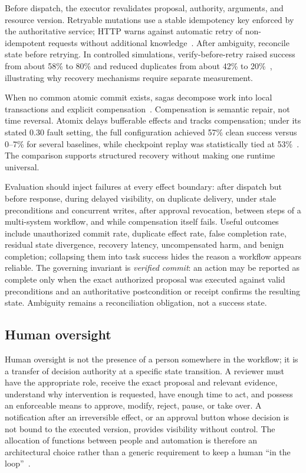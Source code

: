 Before dispatch, the executor revalidates proposal, authority, arguments, and resource version. Retryable mutations use a stable idempotency key enforced by the authoritative service; HTTP warns against automatic retry of non-idempotent requests without additional knowledge~\cite{fielding2022httpsemantics}. After ambiguity, reconcile state before retrying. In controlled simulations, verify-before-retry raised success from about 58\% to 80\% and reduced duplicates from about 42\% to 20\%~\cite{mansoor2026verifiedtoolcalls}, illustrating why recovery mechanisms require separate measurement.

When no common atomic commit exists, sagas decompose work into local transactions and explicit compensation~\cite{garciamolina1987sagas}. Compensation is semantic repair, not time reversal. Atomix delays bufferable effects and tracks compensation; under its stated 0.30 fault setting, the full configuration achieved 57\% clean success versus 0--7\% for several baselines, while checkpoint replay was statistically tied at 53\%~\cite{mohammadi2026atomix}. The comparison supports structured recovery without making one runtime universal.

Evaluation should inject failures at every effect boundary: after dispatch but before response, during delayed visibility, on duplicate delivery, under stale preconditions and concurrent writes, after approval revocation, between steps of a multi-system workflow, and while compensation itself fails. Useful outcomes include unauthorized commit rate, duplicate effect rate, false completion rate, residual state divergence, recovery latency, uncompensated harm, and benign completion; collapsing them into task success hides the reason a workflow appears reliable. The governing invariant is \emph{verified commit}: an action may be reported as complete only when the exact authorized proposal was executed against valid preconditions and an authoritative postcondition or receipt confirms the resulting state. Ambiguity remains a reconciliation obligation, not a success state.

\subsection{Human oversight}

Human oversight is not the presence of a person somewhere in the workflow; it is a transfer of decision authority at a specific state transition. A reviewer must have the appropriate role, receive the exact proposal and relevant evidence, understand why intervention is requested, have enough time to act, and possess an enforceable means to approve, modify, reject, pause, or take over. A notification after an irreversible effect, or an approval button whose decision is not bound to the executed version, provides visibility without control. The allocation of functions between people and automation is therefore an architectural choice rather than a generic requirement to keep a human ``in the loop''~\cite{parasuraman2000levels}.

